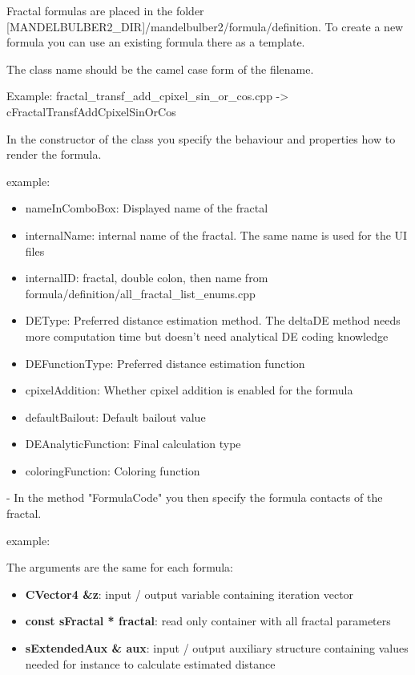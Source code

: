 Fractal formulas are placed in the folder [MANDELBULBER2\_DIR]/mandelbulber2/formula/definition.
To create a new formula you can use an existing formula there as a template.

The class name should be the camel case form of the filename.

Example:
fractal\_transf\_add\_cpixel\_sin\_or\_cos.cpp -> cFractalTransfAddCpixelSinOrCos

In the constructor of the class you specify the behaviour and properties how to render the formula.

example:


\begin{itemize}
	\item nameInComboBox: Displayed name of the fractal
	\item internalName: internal name of the fractal. The same name is used for the UI files
	\item internalID: fractal, double colon, then name from formula/definition/all\_fractal\_list\_enums.cpp 
	\item DEType: Preferred distance estimation method. The deltaDE method needs more computation time but doesn't need analytical DE coding knowledge
	\item DEFunctionType: Preferred distance estimation function
	\item cpixelAddition: Whether cpixel addition is enabled for the formula
	\item defaultBailout: Default bailout value
	\item DEAnalyticFunction: Final calculation type
	\item coloringFunction: Coloring function
\end{itemize}

- In the method "FormulaCode" you then specify the formula contacts of the fractal.

example:


The arguments are the same for each formula:
\begin{itemize}
	\item \textbf{CVector4 \&z}: input / output variable containing iteration vector
	\item \textbf{const sFractal * fractal}: read only container with all fractal parameters
	\item \textbf{sExtendedAux \& aux}: input / output auxiliary structure containing values 
		needed for instance to calculate estimated distance
\end{itemize}

